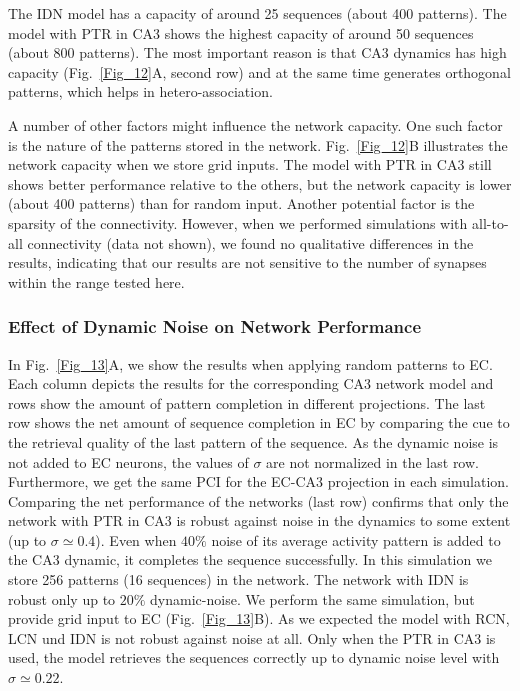 \documentclass[utf8]{frontiersSCNS} %
\begin{document}
The IDN model has a capacity of around 25 sequences (about 400 patterns). The model with PTR in CA3 shows the highest capacity of around 50 sequences (about 800 patterns). The most important reason is that CA3 dynamics has high capacity (Fig.~\ref{Fig_12}A, second row) and at the same time generates orthogonal patterns, which helps in hetero-association.  

A number of other factors might influence the network capacity. One such factor is the nature of the patterns stored in the network. Fig.~\ref{Fig_12}B illustrates the network capacity when we store grid inputs. The model with PTR in CA3 still shows better performance relative to the others, but the network capacity is lower (about 400 patterns) than for random input. Another potential factor is the sparsity of the connectivity. However, when we performed simulations with all-to-all connectivity (data not shown), we found no qualitative differences in the results, indicating that our results are not sensitive to the number of synapses within the range tested here. 

\subsubsection{Effect of Dynamic Noise on Network Performance}

In Fig.~\ref{Fig_13}A, we show the results when applying random patterns to EC. Each column depicts the results for the corresponding CA3 network model and rows show the amount of pattern completion in different projections. The last row shows the net amount of sequence completion in EC by comparing the cue to the retrieval quality of the last pattern of the sequence. 
As the dynamic noise is not added to EC neurons, the values of $ \sigma $ are not normalized in the last row. Furthermore, we get the same PCI for the EC-CA3 projection in each simulation.
Comparing the net performance of the networks (last row) confirms that only the network with PTR in CA3 is robust against noise in the dynamics to some extent (up to $\sigma \simeq 0.4$). Even when $ 40 \% $ noise of its average activity pattern is added to the CA3 dynamic, it completes the sequence successfully. In this simulation we store 256 patterns (16 sequences) in the network. The network with IDN is robust only up to $ 20 \% $ dynamic-noise.    
We perform the same simulation, but provide grid input to EC (Fig.~\ref{Fig_13}B). As we expected the model with RCN, LCN und IDN is not robust against noise at all. Only when the PTR in CA3 is used, the model retrieves the sequences correctly up to dynamic noise level with $\sigma \simeq 0.22$.
\end{document}
